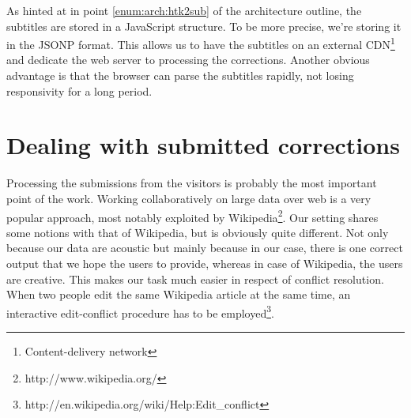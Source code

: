 \documentclass{llncs}
\begin{document}
As hinted at in point \ref{enum:arch:htk2sub} of the architecture outline, the
subtitles are stored in a JavaScript structure. To be more precise, we're
storing it in the JSONP\cite{jsonp} format.
This allows us to have the subtitles on an external
CDN\footnote{Content-delivery network} and dedicate the web server to processing
the corrections. Another obvious advantage is that the browser can parse the
subtitles rapidly, not losing responsivity for a long period.

\section{Dealing with submitted corrections}

Processing the submissions from the visitors is probably the most important point
of the work. Working collaboratively on large data over web is a very popular
approach, most notably exploited by
Wikipedia\footnote{http://www.wikipedia.org/}. Our setting shares some notions
with that of Wikipedia, but is obviously quite different. Not only because our
data are acoustic but mainly because in our case, there is one correct output
that we hope the users to provide, whereas in case of Wikipedia, the users are
creative. This makes our task much easier in respect of conflict resolution.
When two people edit the same Wikipedia article at the same time, an interactive
edit-conflict procedure has to be
employed\footnote{http://en.wikipedia.org/wiki/Help:Edit\_conflict}.
\end{document}
